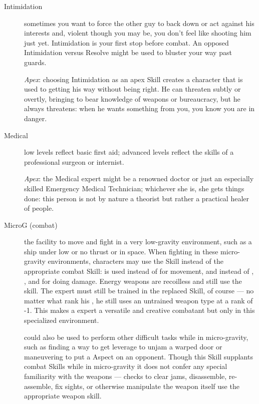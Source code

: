 \begin{description}
\item[Intimidation]
sometimes you want to force the other guy to back down or act against his interests and, violent though you may be, you don't feel like shooting him just yet. Intimidation is your first stop before combat. An opposed Intimidation versus Resolve might be used to bluster your way past guards.

\emph{Apex}: choosing Intimidation as an apex Skill creates a character that is used to getting his way without being right. He can threaten subtly or overtly, bringing to bear knowledge of weapons or bureaucracy, but he always threatens: when he wants something from you, you know you are in danger.

\item[Medical]
low levels reflect basic first aid; advanced levels reflect the skills of a professional surgeon or internist.

\emph{Apex}: the Medical expert might be a renowned doctor or just an especially skilled Emergency Medical Technician; whichever she is, she gets things done: this person is not by nature a theorist but rather a practical healer of people.

\item[MicroG (combat)]
the facility to move and fight in a very low-gravity environment, such as a ship under low or no thrust or in space. When fighting in these micro-gravity environments, characters may use the  Skill instead of the appropriate combat Skill:  is used instead of  for movement, and instead of , , and  for doing damage. Energy weapons are recoilless and still use the  skill. The  expert must still be trained in the replaced Skill, of course --- no matter what rank his , he still uses an untrained weapon type at a rank of -1. This makes a  expert a versatile and creative combatant but only in this specialized environment.

 could also be used to perform other difficult tasks while in micro-gravity, such as finding a way to get leverage to unjam a warped door or maneuvering to put a  Aspect on an opponent. Though this Skill supplants combat Skills while in micro-gravity it does not confer any special familiarity with the weapons --- checks to clear jams, disassemble, re-assemble, fix sights, or otherwise manipulate the weapon itself use the appropriate weapon skill.


\end{description}

